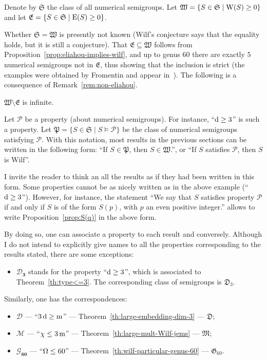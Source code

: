 Denote by $\mathfrak{S}$ the class of all numerical semigroups. Let $\mathfrak{W}=\{S\in\mathfrak{S}\mid \operatorname{W}(S)\ge 0\}$ and let $\mathfrak{E}=\{S\in\mathfrak{S}\mid \operatorname{E}(S)\ge 0\}$. 

Whether $\mathfrak{S}=\mathfrak{W}$ is presently not known (Wilf's conjecture says that the equality holds, but it is still a conjecture).
That $\mathfrak{E}\subseteq \mathfrak{W}$ follows from Proposition~\ref{prop:eliahou-implies-wilf}, and up to genus $60$ there are exactly $5$ numerical semigroups not in $\mathfrak{E}$, thus showing that the inclusion is strict (the examples were obtained by Fromentin and appear in~\cite[pgs~2112,2113]{Eliahou2018JEMS-Wilfs}).
%
The following is a consequence of Remark~\ref{rem:non-eliahou}.
\begin{fact}\label{fact:infinite-non-eliahou}
	$\mathfrak{W}\setminus \mathfrak{E}$ is infinite.
\end{fact}

Let $\mathcal{P}$ be a property (about numerical semigroups). For instance, ``$\operatorname{d}\ge 3$'' is such a property.
Let $\mathfrak{P}=\{S\in\mathfrak{S}\mid S\models \mathcal{P}\}$ be the class of numerical semigroups satisfying $\mathcal{P}$. With this notation, most results in the previous sections can be written in the following form: ``If $S\in\mathfrak{P}$, then $S\in \mathfrak{W}$.'', or ``If $S$ satisfies $\mathcal{P}$, then $S$ is Wilf''. 

I invite the reader to think an all the results as if they had been written in this form. Some properties cannot be as nicely written as in the above example (``$\operatorname{d}\ge 3$''). However, for instance, the statement ``We say that $S$ satisfies property $\mathcal{P}$ if and only if $S$ is of the form $S(p)$, with $p$ an even positive integer.'' allows to write Proposition~\ref{prop:S(q)} in the above form.

By doing so, one can associate a property to each result and conversely. 
Although I do not intend to explicitly give names to all the properties corresponding to the results stated, there are some exceptions:
\begin{itemize}[leftmargin=*]
	\item[]$\mathbf{\mathcal{D}_3}$ stands for the property ``$\operatorname{d}\ge 3$'', which is associated to Theorem~\ref{th:type<=3}. The corresponding class of semigroups is $\mathfrak{D}_3$. 
\end{itemize} 
	Similarly, one has the correspondences:
\begin{itemize}[noitemsep,leftmargin=*]
	\item[]$\mathbf{\mathcal{D}}$ --- ``$3\operatorname{d}\ge \operatorname{m}$'' --- Theorem~\ref{th:large-embedding-dim-3} --- $\mathfrak{D}$;
	\item[]$\mathbf{\mathcal{M}}$ --- ``$\operatorname{\chi}\le 3\operatorname{m}$'' --- Theorem~\ref{th:large-mult-Wilf-jems} --- $\mathfrak{M}$;
	\item[]$\mathbf{\mathcal{G}_{60}}$ --- ``$\operatorname{\Omega} \le 60$'' --- Theorem~\ref{th:wilf-particular-genus-60} --- $\mathfrak{G}_{60}$.
\end{itemize} 

